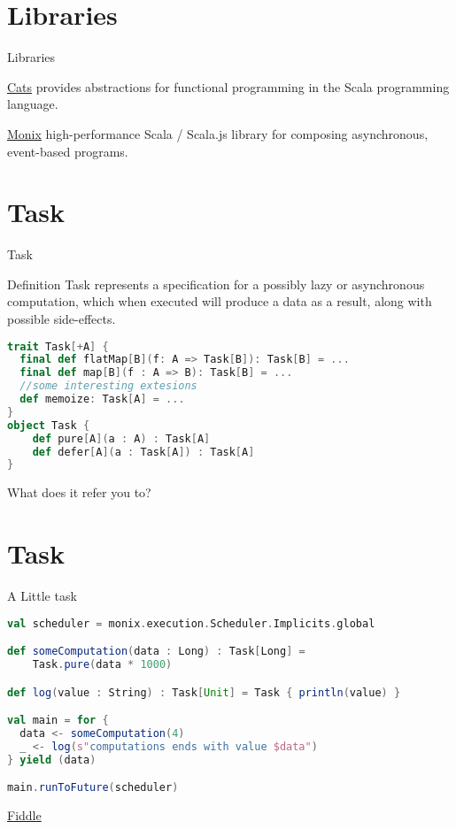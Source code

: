 \documentclass[presentation]{beamer}
\let\oldcite\cite
\renewcommand{\cite}[1]{{\color{blue}\oldcite{#1}}}
\begin{document}
\section{Libraries}
\begin{frame}[fragile]{Libraries}
\begin{block}{\href{https://typelevel.org/cats/}{Cats} \cite{scalacats2017}}
  provides abstractions for functional programming in the Scala programming language.
\end{block}
\begin{block}{\href{https://monix.io/}{Monix}}
  high-performance Scala / Scala.js library for composing asynchronous, event-based programs.
\end{block}
\end{frame}
\section{Task}
\begin{frame}[fragile]{Task}
\begin{block}{Definition}
  Task represents a specification for a possibly lazy or asynchronous computation, which when executed will produce a data as a result, along with possible side-effects.
\end{block}
\begin{lstlisting}[language=Scala]
trait Task[+A] {
  final def flatMap[B](f: A => Task[B]): Task[B] = ...
  final def map[B](f : A => B): Task[B] = ...
  //some interesting extesions
  def memoize: Task[A] = ...
}
object Task {
    def pure[A](a : A) : Task[A]
    def defer[A](a : Task[A]) : Task[A]
}
\end{lstlisting}
\begin{center}
  What does it refer you to?
\end{center}
\end{frame}
\section{Task}
\begin{frame}[fragile]{A Little task}

\begin{lstlisting}[language=Scala]
val scheduler = monix.execution.Scheduler.Implicits.global

def someComputation(data : Long) : Task[Long] = 
    Task.pure(data * 1000)

def log(value : String) : Task[Unit] = Task { println(value) }

val main = for {
  data <- someComputation(4)
  _ <- log(s"computations ends with value $data")
} yield (data)

main.runToFuture(scheduler)
\end{lstlisting}
\begin{center}
  \href{https://scalafiddle.io/sf/C4Qon6a/1}{Fiddle}
\end{center}
\end{frame}
\end{document}
